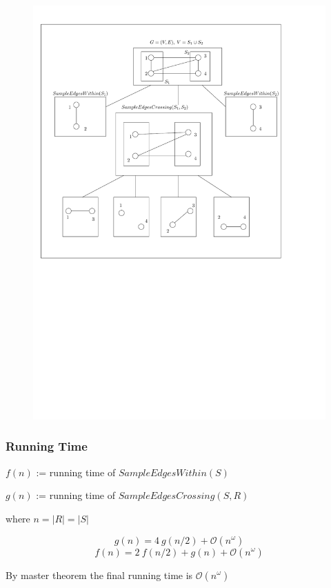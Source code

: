 \documentclass{beamer}
\begin{document}
\begin{frame}
\begin{figure}

\centering
 \includegraphics[scale=0.5]{alg-tree}
 
\end{figure}
\end{frame}

\begin{frame}
 \frametitle{Running Time}

 
 $f(n)$ := running time of $SampleEdgesWithin(S)$
 
 \leavevmode\hphantom{ }
 \leavevmode\hphantom{ }
 
 $g(n)$ := running time of $SampleEdgesCrossing(S, R)$
 
 \leavevmode\hphantom{ }
 \leavevmode\hphantom{ }
 
 where $n = |R| = |S|$
 
 $$ g(n) = 4 \ g(n/2) + \mathcal{O}(n^\omega) $$
 $$ f(n) = 2 \ f(n/2) + g(n) + \mathcal{O}(n^\omega) $$
 
  \leavevmode\hphantom{ }
 \leavevmode\hphantom{ }
 
 By master theorem the final running time is $\mathcal{O}(n^\omega)$
 
\end{frame}
\end{document}
